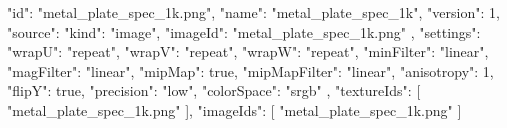 {
  "id": "metal_plate_spec_1k.png",
  "name": "metal_plate_spec_1k",
  "version": 1,
  "source": {
    "kind": "image",
    "imageId": "metal_plate_spec_1k.png"
  },
  "settings": {
    "wrapU": "repeat",
    "wrapV": "repeat",
    "wrapW": "repeat",
    "minFilter": "linear",
    "magFilter": "linear",
    "mipMap": true,
    "mipMapFilter": "linear",
    "anisotropy": 1,
    "flipY": true,
    "precision": "low",
    "colorSpace": "srgb"
  },
  "textureIds": [
    "metal_plate_spec_1k.png"
  ],
  "imageIds": [
    "metal_plate_spec_1k.png"
  ]
}
